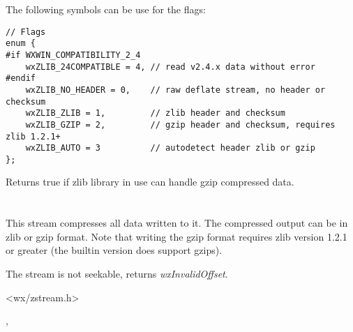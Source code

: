 The following symbols can be use for the flags:

\begin{verbatim}
// Flags
enum {
#if WXWIN_COMPATIBILITY_2_4
    wxZLIB_24COMPATIBLE = 4, // read v2.4.x data without error
#endif
    wxZLIB_NO_HEADER = 0,    // raw deflate stream, no header or checksum
    wxZLIB_ZLIB = 1,         // zlib header and checksum
    wxZLIB_GZIP = 2,         // gzip header and checksum, requires zlib 1.2.1+
    wxZLIB_AUTO = 3          // autodetect header zlib or gzip
};
\end{verbatim}

\label{wxzlibinputstreamcanhandlegzip}


Returns true if zlib library in use can handle gzip compressed data.

\section{}\label{wxzliboutputstream}

This stream compresses all data written to it. The compressed output can be
in zlib or gzip format.
Note that writing the gzip format requires zlib version 1.2.1 or greater
(the builtin version does support gzips).

The stream is not seekable,  returns
 {\it wxInvalidOffset}.




<wx/zstream.h>


,






